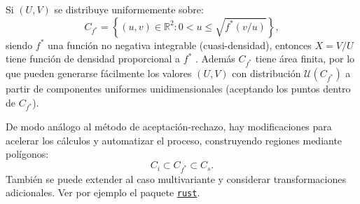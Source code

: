 \documentclass[
  spanish,
  10pt,
]{book}
\theoremstyle{break}
\theoremstyle{nonumberplain}
\begin{document}
Si \((U,V)\) se distribuye uniformemente sobre:
\[C_{f^{\ast}} = \left\{ (u, v) \in \mathbb{R}^{2} : 
0<u\leq \sqrt{f^{\ast}(v/u)} \right\},\]
siendo \(f^{\ast}\) una función no negativa integrable (cuasi-densidad), entonces \(X=V/U\) tiene función de densidad proporcional a \(f^{\ast}\) \citep{kinderman1977}.
Además \(C_{f^{\ast}}\) tiene área finita, por lo que pueden generarse fácilmente los valores \((U,V)\) con distribución \(\mathcal{U}\left(C_{f^{\ast}}\right)\) a partir de componentes uniformes unidimensionales (aceptando los puntos dentro de \(C_{f^{\ast}}\)).

De modo análogo al método de aceptación-rechazo, hay modificaciones para acelerar los cálculos y automatizar el proceso, construyendo regiones mediante polígonos:
\[C_{i}\subset C_{f^{\ast}}\subset C_{s}.\]
También se puede extender al caso multivariante y considerar transformaciones adicionales.
Ver por ejemplo el paquete \href{https://paulnorthrop.github.io/rust/}{\texttt{rust}}.
\end{document}
